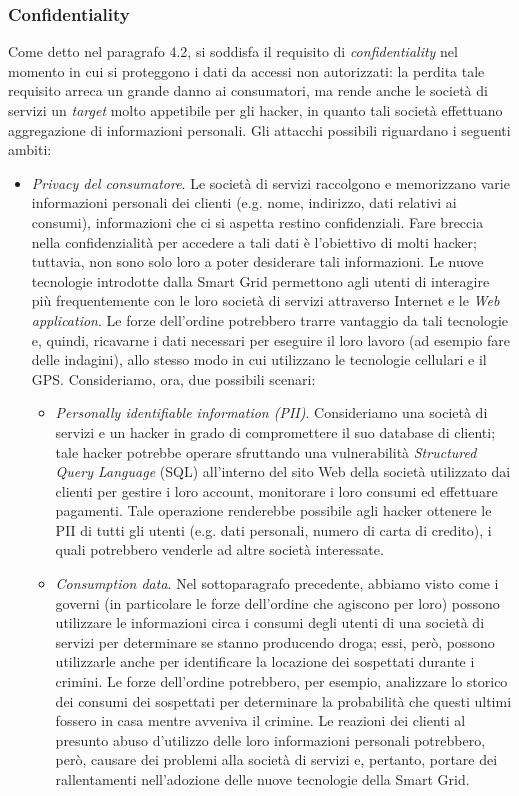 \subsubsection{Confidentiality}
Come detto nel paragrafo 4.2, si soddisfa il requisito di \textit{confidentiality} nel momento in cui si proteggono i dati da accessi non autorizzati: la perdita tale requisito arreca un grande danno ai consumatori, ma rende anche le società di servizi un \textit{target} molto appetibile per gli hacker, in quanto tali società effettuano aggregazione di informazioni personali. Gli attacchi possibili riguardano i seguenti ambiti:
\begin{itemize}
\item \textit{Privacy del consumatore}. Le società di servizi raccolgono e memorizzano varie informazioni personali dei clienti (e.g. nome, indirizzo, dati relativi ai consumi), informazioni che ci si aspetta restino confidenziali. Fare breccia nella confidenzialità per accedere a tali dati è l'obiettivo di molti hacker; tuttavia, non sono solo loro a poter desiderare tali informazioni. Le nuove tecnologie introdotte dalla Smart Grid permettono agli utenti di interagire più frequentemente con le loro società di servizi attraverso Internet e le \textit{Web application}. Le forze dell'ordine potrebbero trarre vantaggio da tali tecnologie e, quindi, ricavarne i dati necessari per eseguire il loro lavoro (ad esempio fare delle indagini), allo stesso modo in cui utilizzano le tecnologie cellulari e il GPS. Consideriamo, ora, due possibili scenari:
	\begin{itemize}
	\item \textit{Personally identifiable information (PII)}. Consideriamo una società di servizi e un hacker in grado di compromettere il suo database di clienti; tale hacker potrebbe operare sfruttando una vulnerabilità \textit{Structured Query Language} (SQL) all'interno del sito Web della società utilizzato dai clienti per gestire i loro account, monitorare i loro consumi ed effettuare pagamenti. Tale operazione renderebbe possibile agli hacker ottenere le PII  di tutti gli utenti (e.g. dati personali, numero di carta di credito), i quali potrebbero venderle ad altre società interessate.
	\item \textit{Consumption data}. Nel sottoparagrafo precedente, abbiamo visto come i governi (in particolare le forze dell'ordine che agiscono per loro) possono utilizzare le informazioni circa i consumi degli utenti di una società di servizi per determinare se stanno producendo droga; essi, però, possono utilizzarle anche per identificare la locazione dei sospettati durante i crimini. Le forze dell'ordine potrebbero, per esempio, analizzare lo storico dei consumi dei sospettati per determinare la probabilità che questi ultimi fossero in casa mentre avveniva il crimine. Le reazioni dei clienti al presunto abuso d'utilizzo delle loro informazioni personali potrebbero, però, causare dei problemi alla società di servizi e, pertanto, portare dei rallentamenti nell'adozione delle nuove tecnologie della Smart Grid.

\end{itemize}
\end{itemize}

